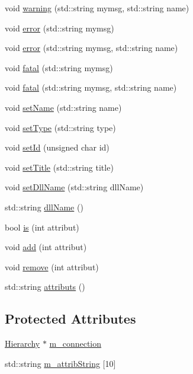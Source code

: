 \begin{DoxyCompactItemize}
\item 
void \hyperlink{classObject_a11f101db4dd73d9391b0231818881d86}{warning} (std::string mymsg, std::string name)
\item 
void \hyperlink{classObject_a204a95f57818c0f811933917a30eff45}{error} (std::string mymsg)
\item 
void \hyperlink{classObject_ad7f6c457733082efa2f9ff5f5c8e119a}{error} (std::string mymsg, std::string name)
\item 
void \hyperlink{classObject_aad5a16aac7516ce65bd5ec02ab07fc80}{fatal} (std::string mymsg)
\item 
void \hyperlink{classObject_ae62acd3d09f716220f75f252dc38bc9a}{fatal} (std::string mymsg, std::string name)
\item 
void \hyperlink{classObject_ae30fea75683c2d149b6b6d17c09ecd0c}{setName} (std::string name)
\item 
void \hyperlink{classObject_aae534cc9d982bcb9b99fd505f2e103a5}{setType} (std::string type)
\item 
void \hyperlink{classObject_a398fe08cba594a0ce6891d59fe4f159f}{setId} (unsigned char id)
\item 
void \hyperlink{classObject_a89557dbbad5bcaa02652f5d7fa35d20f}{setTitle} (std::string title)
\item 
void \hyperlink{classObject_a870c5af919958c2136623b2d7816d123}{setDllName} (std::string dllName)
\item 
std::string \hyperlink{classObject_a2e3947f2870094c332d7454117f3ec63}{dllName} ()
\item 
bool \hyperlink{classAttrib_a704f26af560909ad22065083bb7d4c34}{is} (int attribut)
\item 
void \hyperlink{classAttrib_a235f773af19c900264a190b00a3b4ad7}{add} (int attribut)
\item 
void \hyperlink{classAttrib_a7d4ef7e32d93cb287792b87b857e79f3}{remove} (int attribut)
\item 
std::string \hyperlink{classAttrib_aee7bbf16b144887f196e1341b24f8a26}{attributs} ()
\end{DoxyCompactItemize}
\subsection*{Protected Attributes}
\begin{DoxyCompactItemize}
\item 
\hyperlink{classHierarchy}{Hierarchy} $\ast$ \hyperlink{classElement_abe3de7a5dbbc9a6dd2d7e012e5fdb266}{m\_\-connection}
\item 
std::string \hyperlink{classAttrib_a3414521d7a82476e874b25a5407b5e63}{m\_\-attribString} \mbox{[}10\mbox{]}
\end{DoxyCompactItemize}
